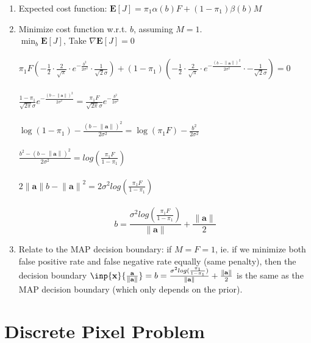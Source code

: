 \documentclass[11pt]{article}
\newcommand{\norm}[1]{\left\lVert#1\right\rVert}
\begin{document}
\begin{enumerate}
    \item Expected cost function: $\mathbf{E}[J] = \pi_1\alpha(b)F+(1-\pi_1)\beta(b)M$
    \item Minimize cost function w.r.t. $b$, assuming $M=1$.\\
    $\min_b \mathbf{E}[J]$, Take $\nabla \mathbf{E}[J] = 0$\\\\
    $\pi_1 F(-\frac{1}{2}\cdot\frac{2}{\sqrt{\pi}}\cdot e^{-\frac{b^2}{2\sigma^2}}\cdot \frac{1}{\sqrt{2}\sigma}) +
    (1-\pi_1)(-\frac{1}{2}\cdot\frac{2}{\sqrt{\pi}}\cdot e^{-\frac{{(b-\norm {\mathbf{a} })}^2}{2\sigma^2}}\cdot -\frac{1}{\sqrt{2}\sigma})=0$\\\\
    $\frac{1-\pi_1}{\sqrt{2\pi}\sigma} e^{-\frac{{(b-\norm {\mathbf{a} })}^2}{2\sigma^2}} = \frac{\pi_1 F}{\sqrt{2\pi}\sigma} e^{-\frac{b^2}{2\sigma^2}}$\\\\
    $\log{(1-\pi_1)}-\frac{{(b-\norm {\mathbf{a} })}^2}{2\sigma^2} =
    \log{(\pi_1F)}-\frac{b^2}{2\sigma^2}$\\\\
    $\frac{b^2-{(b-\norm {\mathbf{a} })}^2}{2\sigma^2} = log{(\frac{\pi_1F}{1-\pi_1})}$\\\\
    $2\norm {\mathbf{a} } b - {\norm {\mathbf{a} }}^2 = 2\sigma^2log{(\frac{\pi_1F}{1-\pi_1})}$\\\\
    \begin{equation}
        b = \frac{\sigma^2log{(\frac{\pi_1F}{1-\pi_1})}}{\norm {\mathbf{a} }} + \frac{\norm {\mathbf{a} }}{2}
    \end{equation}
    \item Relate to the MAP decision boundary: if $M=F=1$, ie. if we minimize both false positive rate and false negative rate equally (same penalty), then the decision boundary $\inp {\mathbf{x}} {\frac{\mathbf{a} }{\norm {\mathbf{a} }}} = b = \frac{\sigma^2log{(\frac{\pi_1}{1-\pi_1})}}{\norm {\mathbf{a} }} + \frac{\norm {\mathbf{a} }}{2}$ is the same as the MAP decision boundary (which only depends on the prior). 
    
\end{enumerate}


\section{Discrete Pixel Problem}
\end{document}
